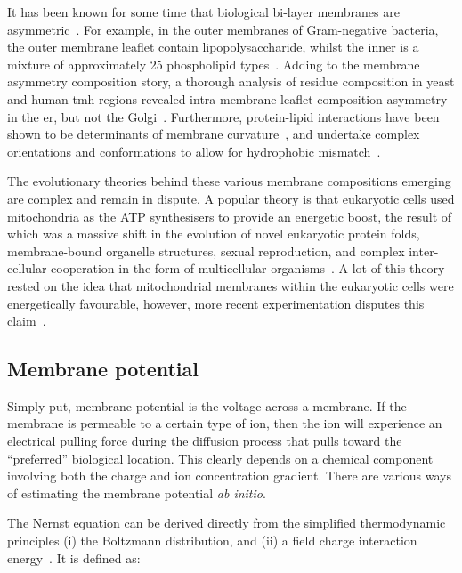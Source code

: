 
It has been known for some time that biological bi-layer membranes are asymmetric~\cite{Singer1972, OpdenKamp1979}.
For example, in the outer membranes of Gram-negative bacteria, the outer membrane leaflet contain lipopolysaccharide, whilst the inner is a mixture of approximately 25 phospholipid types~\cite{VanMeer2008}.
Adding to the membrane asymmetry composition story, a thorough analysis of residue composition in yeast and human \gls{tmh} regions revealed intra-membrane leaflet composition asymmetry in the \gls{er}, but not the Golgi~\cite{Sharpe2010}.
Furthermore, protein-lipid interactions have been shown to be determinants of membrane curvature~\cite{Jensen2004}, and undertake complex orientations and conformations to allow for hydrophobic mismatch~\cite{Planque2003}.

The evolutionary theories behind these various membrane compositions emerging are complex and remain in dispute.
A popular theory is that eukaryotic cells used mitochondria as the ATP synthesisers to provide an energetic boost, the result of which was a massive shift in the evolution of novel eukaryotic protein folds, membrane\--bound organelle structures, sexual reproduction, and complex inter-cellular cooperation in the form of multicellular organisms~\cite{Lane2005, Lane2015}.
A lot of this theory rested on the idea that mitochondrial membranes within the eukaryotic cells were energetically favourable, however, more recent experimentation disputes this claim~\cite{Lynch2017}.

\subsection{Membrane potential}
Simply put, membrane potential is the voltage across a membrane.
If the membrane is permeable to a certain type of ion, then the ion will experience an electrical pulling force during the diffusion process that pulls toward the ``preferred'' biological location.
This clearly depends on a chemical component involving both the charge and ion concentration gradient.
There are various ways of estimating the membrane potential \textit{ab initio}.

The Nernst equation can be derived directly from the simplified thermodynamic principles (i) the Boltzmann distribution, and (ii) a field charge interaction energy~\cite{Feiner1994}.
It is defined as:

